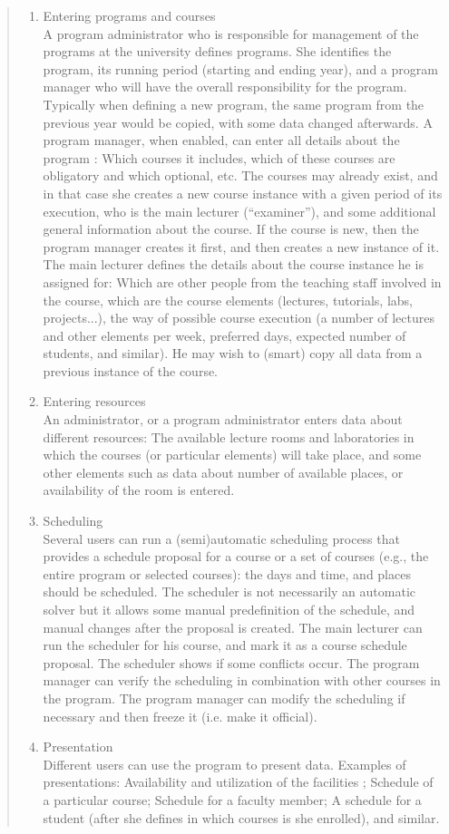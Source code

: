 \documentclass{article}
\begin{document}
\begin{quotation}
\begin{enumerate}
\item Entering programs and courses \\
A program administrator who is responsible for management of the programs at the university defines programs. She identifies the program, its running period (starting and ending year), and a program manager who will have the overall responsibility for the program. Typically when defining a new program, the same program from the previous year would be copied, with some data changed afterwards. A program manager, when enabled, can enter all details about the program : Which courses it includes, which of these courses are obligatory and which optional, etc. The courses may already exist, and in that case she creates a new course instance with a given period of its execution, who is the main lecturer (``examiner''), and some additional general information about the course. If the course is new, then the program manager creates it first, and then creates a new instance of it.\\
The main lecturer defines the details about the course instance he is assigned for: Which are other people from the teaching staff involved in the course, which are the course elements (lectures, tutorials, labs, projects...), the way of possible course execution (a number of lectures and other elements per week, preferred days, expected number of students, and similar). He may wish to (smart) copy all data from a previous instance of the course.
\item Entering resources \\
An administrator, or a program administrator enters data about different resources: The available lecture rooms and laboratories in which the courses (or particular elements) will take place, and some other elements such as data about number of available places, or availability of the room is entered.
\item Scheduling \\
Several users can run a (semi)automatic scheduling process that provides a schedule proposal for a course or a set of courses (e.g., the entire program or selected courses): the days and time, and places should be scheduled. The scheduler is not necessarily an automatic solver but it allows some manual predefinition of the schedule, and manual changes after the proposal is created. The main lecturer can run the scheduler for his course, and mark it as a course schedule proposal. The scheduler shows if some conflicts occur. The program manager can verify the scheduling in combination with other courses in the program. The program manager can modify the scheduling if necessary and then freeze it (i.e. make it official).
\item Presentation \\
Different users can use the program to present data. Examples of presentations: Availability and utilization of the facilities ; Schedule of a particular course; Schedule for a faculty member; A schedule for a student (after she defines in which courses is she enrolled), and similar.
\end{enumerate}

\end{quotation}
\end{document}
